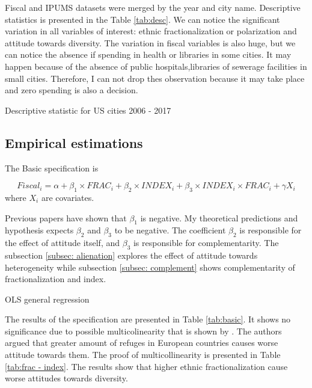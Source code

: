 \documentclass[letterpaper,11pt]{article}
\begin{document}
Fiscal and IPUMS datasets were merged by the year and city name. Descriptive statistics is presented in the Table \ref{tab:desc}. We can notice the significant variation in all variables of interest: ethnic fractionalization or polarization and attitude towards diversity. The variation in fiscal variables is also huge, but we can notice the absence if spending in health or libraries in some cities. It may happen because of the absence of public hospitals,libraries of sewerage facilities in small cities. Therefore, I can not drop thes observation because it may take place and zero spending is also a decision.

\begin{table}[h]
    \centering
    \footnotesize
    
    \caption{Descriptive statistic for US cities 2006 - 2017}
    \label{tab:desc}
\end{table}

\subsection{Empirical estimations}

The Basic specification is 

\begin{equation}
\label{eq: basic}
    Fiscal_i = \alpha + \beta_1 \times FRAC_i + \beta_2 \times INDEX_i + \beta_3 \times INDEX_i \times FRAC_i + \gamma X_i
\end{equation}
where $X_i$ are covariates.

Previous papers have shown that $\beta_1$ is negative. My theoretical predictions and hypothesis expects $\beta_2$ and $\beta_3$ to be negative. The coefficient $\beta_2$ is responsible for the effect of attitude itself, and $\beta_3$ is responsible for complementarity. The subsection \ref{subsec: alienation} explores the effect of attitude towards heterogeneity while subsection \ref{subsec: complement} shows complementarity of fractionalization and index.

\begin{table}[H]
    \centering
    \footnotesize
    
    \caption{OLS general regression}
    \label{tab:basic}
\end{table}

The results of the specification are presented in Table \ref{tab:basic}. It shows no significance due to possible multicolinearity that is shown by \cite{Refuges}. The authors argued that greater amount of refuges in European countries causes worse attitude towards them. The proof of multicollinearity is presented in Table \ref{tab:frac - index}. The results show that higher ethnic fractionalization cause worse attitudes towards diversity.
\end{document}
